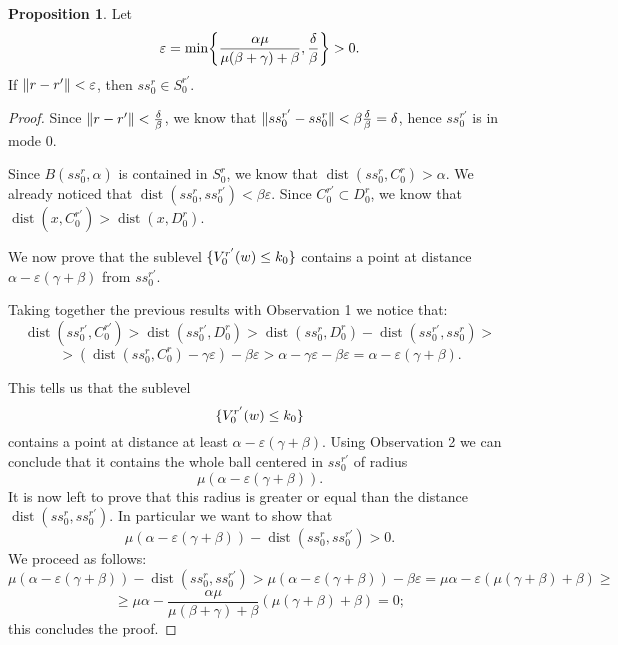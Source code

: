 \documentclass{article}
\theoremstyle{definition}
\newtheorem{prop}[lemma]{Proposition}
\DeclarePairedDelimiter{\set}{\{}{\}}
\DeclarePairedDelimiter{\norm}{\lVert }{\rVert}
\renewcommand{\epsilon}{\varepsilon}
\DeclareMathOperator{\dist}{dist}
\begin{document}
\begin{prop}
Let 
\[ \epsilon = \min \set*{\frac{\alpha \mu}{\mu( \beta + \gamma) + \beta}, \frac{\delta}{\beta}  } > 0.\]
If $\norm{r - r'} < \epsilon$, then $ss_0^{r} \in S_0^{r'}$.
\end{prop}
\begin{proof}
    Since $\norm{r - r'} <  \frac{\delta}{\beta}$, we know that $\norm{ss_0^{r'} - ss_0^r} < \beta \frac{\delta}{\beta} = \delta$, hence $ss_0^{r'}$ is in mode 0.

    Since $B(ss_0^r, \alpha)$ is contained in $S_0^r$, we know that $\dist(ss_0^r, C_0^r) >\alpha$. We already noticed that $\dist(ss_0^r, ss_0^{r'}) < \beta \epsilon$. Since $ C_0^{r'} \subset D_0^{r}$, we know that $\dist(x,  C_0^{r'}) > \dist(x, D_0^{r})$. 
    
    We now prove that the sublevel $ \set{V_0^{r'}(w) \leq k_0}$ contains a point at distance $\alpha - \epsilon (\gamma+ \beta)$ from $ss_0^{r'}$.
    
    Taking together the previous results with Observation 1 we notice that:
    \[ \dist(ss_0^{r'}, C_0^{r'})>  \dist(ss_0^{r'}, D_0^{r}) > \dist(ss_0^{r}, D_0^{r}) -\dist(ss_0^{r'}, ss_0^{r}) >\]\[> (\dist(ss_0^{r}, C_0^r) - \gamma\epsilon) - \beta \epsilon> \alpha - \gamma\epsilon - \beta\epsilon = \alpha - \epsilon (\gamma+ \beta). \]
    
    This tells us that the sublevel 
    \[ \set{V_0^{r'}(w) \leq k_0}  \]
    contains a point at distance at least $\alpha - \epsilon (\gamma+ \beta)$. Using Observation 2 we can conclude that it contains the whole ball centered in $ss_0^{r'}$ of radius
    \[ \mu (\alpha - \epsilon (\gamma+ \beta)). \]
    It is now left to prove that this radius is greater or equal than the distance $\dist(ss_0^r, ss_0^{r'})$. In particular we want to show that
    \[  \mu (\alpha - \epsilon (\gamma+ \beta)) - \dist(ss_0^r, ss_0^{r'}) > 0.   \]
    We proceed as follows:
    \[   \mu (\alpha - \epsilon (\gamma+ \beta)) - \dist(ss_0^r, ss_0^{r'}) > \mu (\alpha - \epsilon (\gamma+ \beta)) - \beta \epsilon = \mu \alpha - \epsilon ( \mu (\gamma+ \beta) + \beta) \geq \] \[ \geq  \mu \alpha - \frac{\alpha \mu}{\mu( \beta + \gamma) + \beta} ( \mu (\gamma+ \beta) + \beta) = 0;  \]
    this concludes the proof.

\end{proof}
\end{document}
